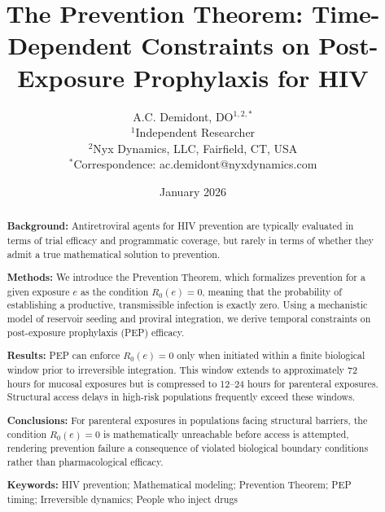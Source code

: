 \documentclass[12pt]{article}
\begin{document}
\title{\textbf{The Prevention Theorem: Time-Dependent Constraints on Post-Exposure Prophylaxis for HIV}}

\author{A.C. Demidont, DO$^{1,2,*}$\\[0.5em]
\small $^1$Independent Researcher\\
\small $^2$Nyx Dynamics, LLC, Fairfield, CT, USA\\[0.3em]
\small $^*$Correspondence: ac.demidont@nyxdynamics.com}

\date{January 2026}

\maketitle

\begin{abstract}
\noindent\textbf{Background:} Antiretroviral agents for HIV prevention are typically evaluated in terms of trial efficacy and programmatic coverage, but rarely in terms of whether they admit a true mathematical solution to prevention.

\noindent\textbf{Methods:} We introduce the Prevention Theorem, which formalizes prevention for a given exposure $e$ as the condition $R_0(e)=0$, meaning that the probability of establishing a productive, transmissible infection is exactly zero. Using a mechanistic model of reservoir seeding and proviral integration, we derive temporal constraints on post-exposure prophylaxis (PEP) efficacy.

\noindent\textbf{Results:} PEP can enforce $R_0(e)=0$ only when initiated within a finite biological window prior to irreversible integration. This window extends to approximately 72 hours for mucosal exposures but is compressed to 12--24 hours for parenteral exposures. Structural access delays in high-risk populations frequently exceed these windows.

\noindent\textbf{Conclusions:} For parenteral exposures in populations facing structural barriers, the condition $R_0(e)=0$ is mathematically unreachable before access is attempted, rendering prevention failure a consequence of violated biological boundary conditions rather than pharmacological efficacy.

\noindent\textbf{Keywords:} HIV prevention; Mathematical modeling; Prevention Theorem; PEP timing; Irreversible dynamics; People who inject drugs
\end{abstract}

\newpage
\end{document}
